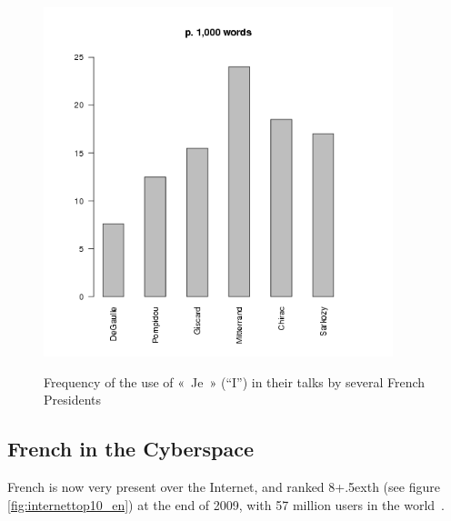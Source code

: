\begin{multicols}{2}
\begin{figure}[ht]
\begin{center}
 \includegraphics[height=4.0in]{_media/french/je_freq_eng.png} 
  \caption{Frequency of the use of «~Je~» (``I'') in their talks by several French Presidents}
\label{fig:je_stats_en}
\end{center}
\end{figure}

\subsection{French in the Cyberspace}

French is now very present over the Internet, and ranked
8\raise+.5ex\hbox{th} (see figure \ref{fig:internettop10_en}) at the end
of 2009, with 57 million users in the world~\cite{internettop10}.


\end{multicols}
